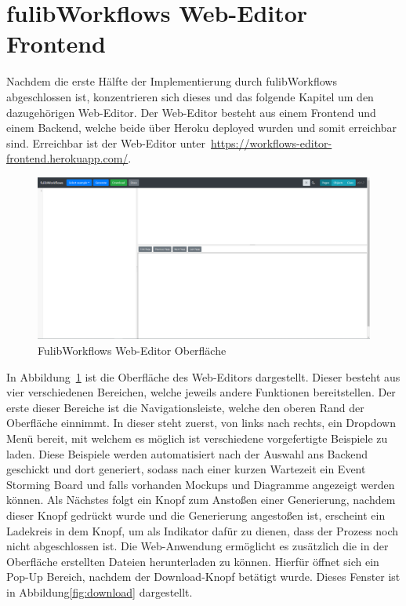 \section{fulibWorkflows Web-Editor Frontend}\label{sec:editor-frontend}
Nachdem die erste Hälfte der Implementierung durch fulibWorkflows abgeschlossen ist, konzentrieren sich dieses und das folgende Kapitel um den dazugehörigen Web-Editor.
Der Web-Editor besteht aus einem Frontend und einem Backend, welche beide über Heroku deployed wurden und somit erreichbar sind.
Erreichbar ist der Web-Editor unter~\url{https://workflows-editor-frontend.herokuapp.com/}.

\begin{figure}[h]
    \centering
    \includegraphics[width=1.0\textwidth]{images/3.2/workflows-complete}
    \caption{FulibWorkflows Web-Editor Oberfläche}
    \label{fig:frontend}
\end{figure}

In Abbildung~\ref{fig:frontend} ist die Oberfläche des Web-Editors dargestellt.
Dieser besteht aus vier verschiedenen Bereichen, welche jeweils andere Funktionen bereitstellen.
Der erste dieser Bereiche ist die Navigationsleiste, welche den oberen Rand der Oberfläche einnimmt.
In dieser steht zuerst, von links nach rechts, ein Dropdown Menü bereit, mit welchem es möglich ist verschiedene vorgefertigte Beispiele zu laden.
Diese Beispiele werden automatisiert nach der Auswahl ans Backend geschickt und dort generiert, sodass nach einer kurzen Wartezeit ein Event Storming Board und falls
vorhanden Mockups und Diagramme angezeigt werden können.
Als Nächstes folgt ein Knopf zum Anstoßen einer Generierung, nachdem dieser Knopf gedrückt wurde und die Generierung angestoßen ist, erscheint ein Ladekreis in dem Knopf,
um als Indikator dafür zu dienen, dass der Prozess noch nicht abgeschlossen ist.
Die Web-Anwendung ermöglicht es zusätzlich die in der Oberfläche erstellten Dateien herunterladen zu können.
Hierfür öffnet sich ein Pop-Up Bereich, nachdem der Download-Knopf betätigt wurde.
Dieses Fenster ist in Abbildung\ref{fig:download} dargestellt.

